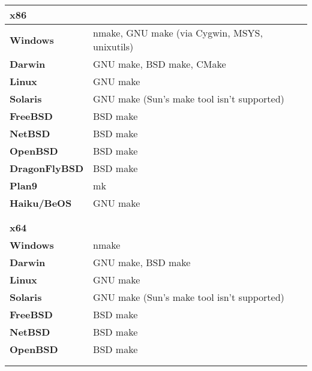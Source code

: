 \begin{tabular}{l l}
{\bf{\large x86}}             &                                                      \\
\hline\hline
{\bf Windows}                 & nmake, GNU make (via Cygwin, MSYS, unixutils)        \\
{\bf Darwin}                  & GNU make, BSD make, CMake                            \\
{\bf Linux}                   & GNU make                                             \\
{\bf Solaris}                 & GNU make (Sun's make tool isn't supported)           \\
{\bf FreeBSD}                 & BSD make                                             \\
{\bf NetBSD}                  & BSD make                                             \\
{\bf OpenBSD}                 & BSD make                                             \\
{\bf DragonFlyBSD}            & BSD make                                             \\
{\bf Plan9}                   & mk                                                   \\
{\bf Haiku/BeOS}              & GNU make                                             \\
\hline
                              &                                                      \\
                              &                                                      \\


{\bf{\large x64}}             &                                                      \\
\hline\hline
{\bf Windows}                 & nmake                                                \\
{\bf Darwin}                  & GNU make, BSD make                                   \\
{\bf Linux}                   & GNU make                                             \\
{\bf Solaris}                 & GNU make (Sun's make tool isn't supported)           \\
{\bf FreeBSD}                 & BSD make                                             \\
{\bf NetBSD}                  & BSD make                                             \\
{\bf OpenBSD}                 & BSD make                                             \\
\hline
                              &                                                      \\
                              &                                                      \\



\end{tabular}

